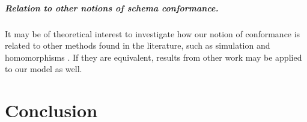 \documentclass{report}
\theoremstyle{definition}
\begin{document}
\paragraph{Relation to other notions of schema conformance.} It may be of theoretical interest to investigate how our notion of conformance is related to other methods found in the literature, such as simulation \citep{buneman1997adding} and homomorphisms \citep{bonifati2019schema}. If they are equivalent, results from other work may be applied to our model as well.

\chapter{Conclusion}



\end{document}
